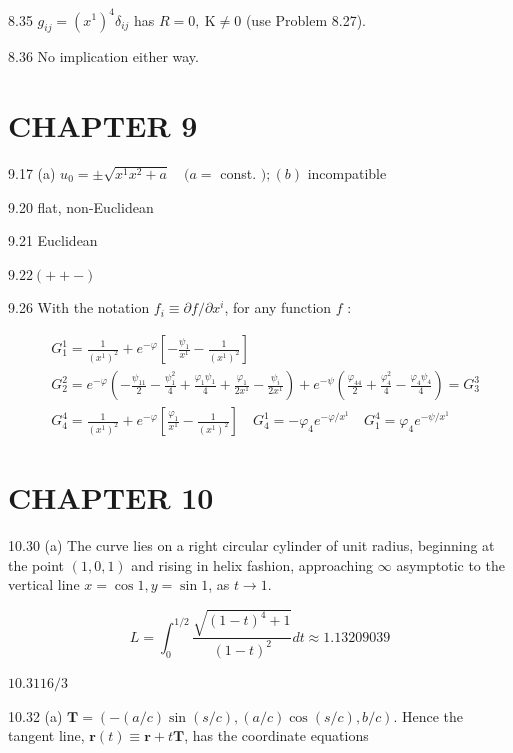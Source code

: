 \documentclass[10pt]{article}
\begin{document}
8.35 $g_{i j}=\left(x^{1}\right)^{4} \delta_{i j}$ has $R=0, \mathrm{~K} \neq 0$ (use Problem 8.27).

8.36 No implication either way.

\section*{CHAPTER 9}
9.17 (a) $u_{0}= \pm \sqrt{x^{1} x^{2}+a} \quad(a=$ const. $) ;(b)$ incompatible

9.20 flat, non-Euclidean

9.21 Euclidean

$9.22(++-)$

9.26 With the notation $f_{i} \equiv \partial f / \partial x^{i}$, for any function $f$ :

$$
\begin{aligned}
& G_{1}^{1}=\frac{1}{\left(x^{1}\right)^{2}}+e^{-\varphi}\left[-\frac{\psi_{1}}{x^{1}}-\frac{1}{\left(x^{1}\right)^{2}}\right] \\
& G_{2}^{2}=e^{-\varphi}\left(-\frac{\psi_{11}}{2}-\frac{\psi_{1}^{2}}{4}+\frac{\varphi_{1} \psi_{1}}{4}+\frac{\varphi_{1}}{2 x^{1}}-\frac{\psi_{i}}{2 x^{1}}\right)+e^{-\psi}\left(\frac{\varphi_{44}}{2}+\frac{\varphi_{4}^{2}}{4}-\frac{\varphi_{4} \psi_{4}}{4}\right)=G_{3}^{3} \\
& G_{4}^{4}=\frac{1}{\left(x^{1}\right)^{2}}+e^{-\varphi}\left[\frac{\varphi_{1}}{x^{1}}-\frac{1}{\left(x^{1}\right)^{2}}\right] \quad G_{4}^{1}=-\varphi_{4} e^{-\varphi / x^{1}} \quad G_{1}^{4}=\varphi_{4} e^{-\psi / x^{1}}
\end{aligned}
$$

\section*{CHAPTER 10}
10.30 (a) The curve lies on a right circular cylinder of unit radius, beginning at the point $(1,0,1)$ and rising in helix fashion, approaching $\infty$ asymptotic to the vertical line $x=\cos 1, y=\sin 1$, as $t \rightarrow 1$.


\begin{equation*}
L=\int_{0}^{1 / 2} \frac{\sqrt{(1-t)^{4}+1}}{(1-t)^{2}} d t \approx 1.13209039 \tag{b}
\end{equation*}


$10.3116 / 3$

10.32 (a) $\mathbf{T}=(-(a / c) \sin (s / c),(a / c) \cos (s / c), b / c)$. Hence the tangent line, $\mathbf{r}(t) \equiv \mathbf{r}+t \mathbf{T}$, has the coordinate equations
\end{document}
